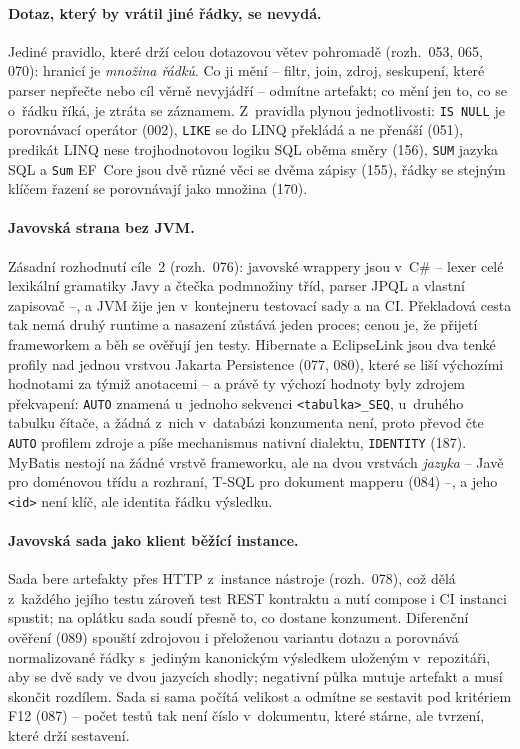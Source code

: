 \documentclass{article}
\begin{document}
\paragraph{Dotaz, který by vrátil jiné řádky, se nevydá.} Jediné pravidlo, které drží celou dotazovou větev pohromadě (rozh.~053, 065, 070): hranicí je \emph{množina řádků}. Co ji mění -- filtr, join, zdroj, seskupení, které parser nepřečte nebo cíl věrně nevyjádří -- odmítne artefakt; co mění jen to, co se o~řádku říká, je ztráta se záznamem. Z~pravidla plynou jednotlivosti: \texttt{IS NULL} je porovnávací operátor (002), \texttt{LIKE} se do LINQ překládá a ne přenáší (051), predikát LINQ nese trojhodnotovou logiku SQL oběma směry (156), \texttt{SUM} jazyka SQL a \texttt{Sum} EF~Core jsou dvě různé věci se dvěma zápisy (155), řádky se stejným klíčem řazení se porovnávají jako množina (170).

\paragraph{Javovská strana bez JVM.} Zásadní rozhodnutí cíle~2 (rozh.~076): javovské wrappery jsou v~C\# -- lexer celé lexikální gramatiky Javy a čtečka podmnožiny tříd, parser JPQL a vlastní zapisovač --, a JVM žije jen v~kontejneru testovací sady a na CI. Překladová cesta tak nemá druhý runtime a nasazení zůstává jeden proces; cenou je, že přijetí frameworkem a běh se ověřují jen testy. Hibernate a EclipseLink jsou dva tenké profily nad jednou vrstvou Jakarta Persistence (077, 080), které se liší výchozími hodnotami za týmiž anotacemi -- a právě ty výchozí hodnoty byly zdrojem překvapení: \texttt{AUTO} znamená u~jednoho sekvenci \texttt{<tabulka>\_SEQ}, u~druhého tabulku čítače, a žádná z~nich v~databázi konzumenta není, proto převod čte \texttt{AUTO} profilem zdroje a píše mechanismus nativní dialektu, \texttt{IDENTITY} (187). MyBatis nestojí na žádné vrstvě frameworku, ale na dvou vrstvách \emph{jazyka} -- Javě pro doménovou třídu a rozhraní, T-SQL pro dokument mapperu (084) --, a jeho \texttt{<id>} není klíč, ale identita řádku výsledku.

\paragraph{Javovská sada jako klient běžící instance.} Sada bere artefakty přes HTTP z~instance nástroje (rozh.~078), což dělá z~každého jejího testu zároveň test REST kontraktu a nutí compose i CI instanci spustit; na oplátku sada soudí přesně to, co dostane konzument. Diferenční ověření (089) spouští zdrojovou i přeloženou variantu dotazu a porovnává normalizované řádky s~jediným kanonickým výsledkem uloženým v~repozitáři, aby se dvě sady ve dvou jazycích shodly; negativní půlka mutuje artefakt a musí skončit rozdílem. Sada si sama počítá velikost a odmítne se sestavit pod kritériem F12 (087) -- počet testů tak není číslo v~dokumentu, které stárne, ale tvrzení, které drží sestavení.
\end{document}
